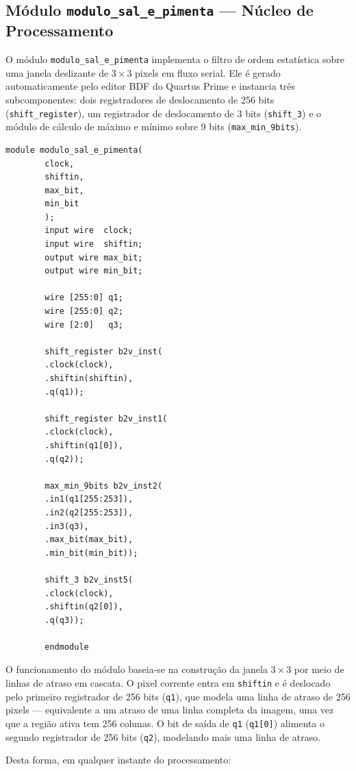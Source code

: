 \documentclass[12pt, a4paper]{article}
\begin{document}
	\subsection{Módulo \texttt{modulo\_sal\_e\_pimenta} --- Núcleo de Processamento}
	
	O módulo \texttt{modulo\_sal\_e\_pimenta} implementa o filtro de ordem
	estatística sobre uma janela deslizante de $3\times3$ pixels em fluxo serial.
	Ele é gerado automaticamente pelo editor BDF do Quartus Prime e instancia três
	subcomponentes: dois registradores de deslocamento de 256 bits
	(\texttt{shift\_register}), um registrador de deslocamento de 3 bits
	(\texttt{shift\_3}) e o módulo de cálculo de máximo e mínimo sobre 9 bits
	(\texttt{max\_min\_9bits}).
	
	\begin{lstlisting}[style=verilog, caption={\texttt{modulo\_sal\_e\_pimenta.v} --- Núcleo de processamento do filtro sal e pimenta com janela $3\times3$ sobre fluxo serial de pixels.}, label={lst:salp}]
		module modulo_sal_e_pimenta(
		clock,
		shiftin,
		max_bit,
		min_bit
		);
		input wire  clock;
		input wire  shiftin;
		output wire max_bit;
		output wire min_bit;
		
		wire [255:0] q1;
		wire [255:0] q2;
		wire [2:0]   q3;
		
		shift_register b2v_inst(
		.clock(clock),
		.shiftin(shiftin),
		.q(q1));
		
		shift_register b2v_inst1(
		.clock(clock),
		.shiftin(q1[0]),
		.q(q2));
		
		max_min_9bits b2v_inst2(
		.in1(q1[255:253]),
		.in2(q2[255:253]),
		.in3(q3),
		.max_bit(max_bit),
		.min_bit(min_bit));
		
		shift_3 b2v_inst5(
		.clock(clock),
		.shiftin(q2[0]),
		.q(q3));
		
		endmodule
	\end{lstlisting}
	
	O funcionamento do módulo baseia-se na construção da janela $3\times3$ por
	meio de linhas de atraso em cascata. O pixel corrente entra em \texttt{shiftin}
	e é deslocado pelo primeiro registrador de 256 bits (\texttt{q1}), que modela
	uma linha de atraso de 256 pixels --- equivalente a um atraso de uma linha
	completa da imagem, uma vez que a região ativa tem 256 colunas. O bit de saída
	de \texttt{q1} (\texttt{q1[0]}) alimenta o segundo registrador de 256 bits
	(\texttt{q2}), modelando mais uma linha de atraso.
	
	Desta forma, em qualquer instante do processamento:
	
\end{document}
